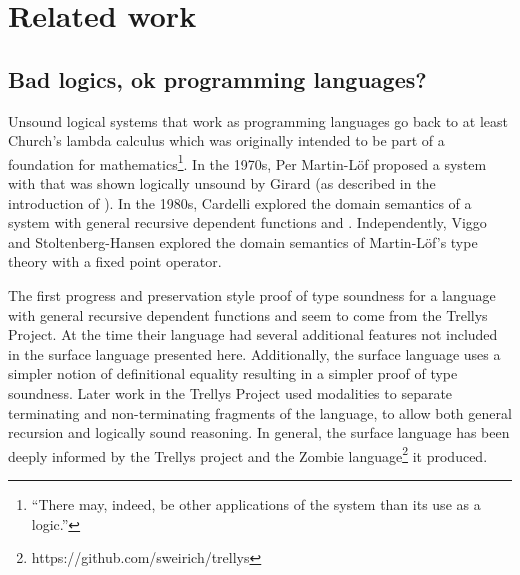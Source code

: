 \section{Related work}
 
\subsection{Bad logics, ok programming languages?}
 
Unsound logical systems that work as programming languages go back to at least Church's lambda calculus which was originally intended to be part of a foundation for mathematics\footnote{``There may, indeed, be other applications of the system than its use as a logic.''\cite[p.349]{10.2307/1968337}}.
In the 1970s, Per Martin-L{\"o}f proposed a system with \tit{} that was shown logically unsound by Girard (as described in the introduction of \cite{Martin-Lof-1972}).
In the 1980s, Cardelli explored the domain semantics of a system with general recursive dependent functions and \tit{}\cite{cardelli1986polymorphic}.
Independently, Viggo and Stoltenberg-Hansen\cite{PALMGREN1990135} explored the domain semantics of Martin-L{\"o}f's type theory with a fixed point operator.

The first progress and preservation style proof of type soundness for a language with general recursive dependent functions and \tit{} seem to come from the Trellys Project\cite{sjoberg2012irrelevance}.
At the time their language had several additional features not included in the surface language presented here.
Additionally, the surface language uses a simpler notion of definitional equality resulting in a simpler proof of type soundness.
Later work in the Trellys Project\cite{casinghino2014combining,casinghino2014combiningthesis} used modalities to separate terminating and non-terminating fragments of the language, to allow both general recursion and logically sound reasoning. %
In general, the surface language has been deeply informed by the Trellys project\cite{sjoberg2012irrelevance,casinghino2014combining,casinghino2014combiningthesis,sjoberg2015programming,sjoberg2015dependently} and the Zombie language\footnote{https://github.com/sweirich/trellys} it produced.
 
 
